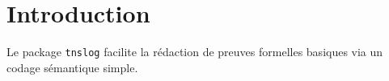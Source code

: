\documentclass[12pt,a4paper]{article}
\begin{document}
\section{Introduction}

Le package \verb+tnslog+ facilite la rédaction de preuves formelles basiques via un codage sémantique simple.
\end{document}
